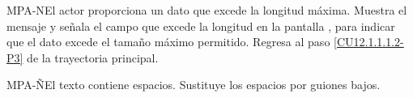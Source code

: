 	\begin{UCtrayectoriaA}{MPA-N}{El actor proporciona un dato que excede la longitud máxima.}
		\UCpaso[\UCsist] Muestra el mensaje  y señala el campo que excede la longitud en la pantalla , para indicar que el dato excede el tamaño máximo permitido.
		\UCpaso Regresa al paso \ref{CU12.1.1.1.2-P3} de la trayectoria principal.
	\end{UCtrayectoriaA}

	\begin{UCtrayectoriaA}{MPA-Ñ}{El texto contiene espacios.}
		\UCpaso[\UCsist] Sustituye los espacios por guiones bajos.
	\end{UCtrayectoriaA}